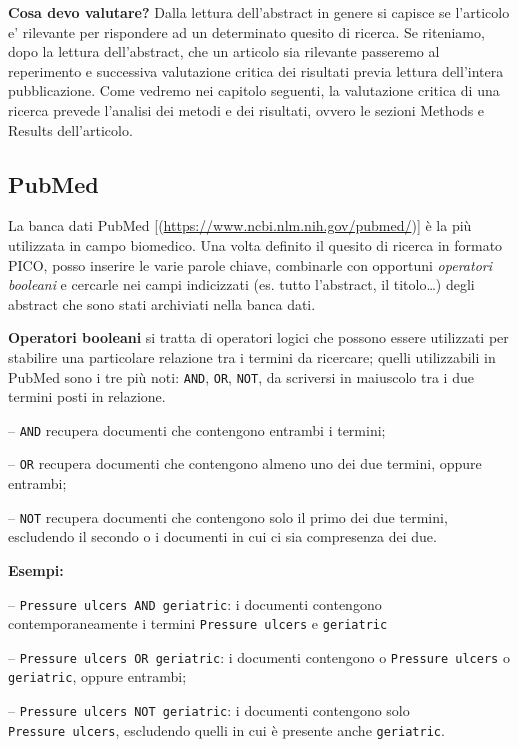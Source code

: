 \documentclass[]{book}
\begin{document}
\textbf{Cosa devo valutare?} Dalla lettura dell'abstract in genere si capisce se l'articolo e' rilevante per rispondere ad un determinato quesito di ricerca. Se riteniamo, dopo la lettura dell'abstract, che un articolo sia rilevante passeremo al reperimento e successiva valutazione critica dei risultati previa lettura dell'intera pubblicazione. Come vedremo nei capitolo seguenti, la valutazione critica di una ricerca prevede l'analisi dei metodi e dei risultati, ovvero le sezioni Methods e Results dell'articolo.

\hypertarget{pubmed}{%
\subsection{PubMed}\label{pubmed}}

La banca dati PubMed {[}(\url{https://www.ncbi.nlm.nih.gov/pubmed/}){]} è la più utilizzata in campo biomedico. Una volta definito il quesito di ricerca in formato PICO, posso inserire le varie parole chiave, combinarle con opportuni \emph{operatori booleani} e cercarle nei campi indicizzati (es. tutto l'abstract, il titolo\ldots{}) degli abstract che sono stati archiviati nella banca dati.

\textbf{Operatori booleani} si tratta di operatori logici che possono essere utilizzati per stabilire una particolare relazione tra i termini da ricercare; quelli utilizzabili in PubMed sono i tre più noti: \texttt{AND}, \texttt{OR}, \texttt{NOT}, da scriversi in maiuscolo tra i due termini posti in relazione.

-- \texttt{AND} recupera documenti che contengono entrambi i termini;

-- \texttt{OR} recupera documenti che contengono almeno uno dei due termini, oppure entrambi;

-- \texttt{NOT} recupera documenti che contengono solo il primo dei due termini, escludendo il secondo o i documenti in cui ci sia compresenza dei due.

\textbf{Esempi:}

-- \texttt{Pressure\ ulcers\ AND\ geriatric}: i documenti contengono contemporaneamente i termini \texttt{Pressure\ ulcers} e \texttt{geriatric}

-- \texttt{Pressure\ ulcers\ OR\ geriatric}: i documenti contengono o \texttt{Pressure\ ulcers} o \texttt{geriatric}, oppure entrambi;

-- \texttt{Pressure\ ulcers\ NOT\ geriatric}: i documenti contengono solo \texttt{Pressure\ ulcers}, escludendo quelli in cui è presente anche \texttt{geriatric}.
\end{document}
